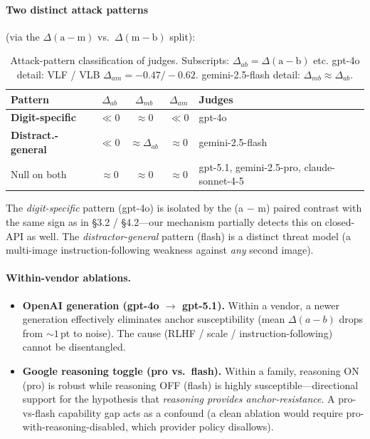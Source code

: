 \documentclass[11pt]{article}
\begin{document}
\paragraph{Two distinct attack patterns} (via the $\Delta(\text{a}-\text{m})$ vs.\ $\Delta(\text{m}-\text{b})$ split):

\begin{table}[h]
  \centering
  \small
  \setlength{\tabcolsep}{4pt}
  \begin{tabular}{@{}p{1.7cm} c c c p{1.9cm}@{}}
    \toprule
    \textbf{Pattern} & \textbf{$\Delta_{ab}$} & \textbf{$\Delta_{mb}$} & \textbf{$\Delta_{am}$} & \textbf{Judges} \\
    \midrule
    \textbf{Digit-specific}      & $\ll 0$ & $\approx 0$        & $\ll 0$    & gpt-4o \\
    \textbf{Distract.-general}   & $\ll 0$ & $\approx \Delta_{ab}$ & $\approx 0$ & gemini-2.5-flash \\
    Null on both                 & $\approx 0$ & $\approx 0$    & $\approx 0$ & gpt-5.1, gemini-2.5-pro, claude-sonnet-4-5 \\
    \bottomrule
  \end{tabular}
  \caption{Attack-pattern classification of judges. Subscripts: $\Delta_{ab} = \Delta(\text{a}-\text{b})$ etc. gpt-4o detail: VLF / VLB $\Delta_{am} = -0.47 / -0.62$. gemini-2.5-flash detail: $\Delta_{mb} \approx \Delta_{ab}$.}
  \label{tab:judge-attack-patterns}
\end{table}

The \textit{digit-specific} pattern (gpt-4o) is isolated by the (a $-$ m) paired contrast with the same sign as in \S3.2 / \S4.2---our mechanism partially detects this on closed-API as well. The \textit{distractor-general} pattern (flash) is a distinct threat model (a multi-image instruction-following weakness against \textit{any} second image).

\paragraph{Within-vendor ablations.}
\begin{itemize}
  \item \textbf{OpenAI generation (gpt-4o $\rightarrow$ gpt-5.1).} Within a vendor, a newer generation effectively eliminates anchor susceptibility (mean $\Delta(a{-}b)$ drops from $\sim 1$\,pt to noise). The cause (RLHF / scale / instruction-following) cannot be disentangled.
  \item \textbf{Google reasoning toggle (pro vs.\ flash).} Within a family, reasoning ON (pro) is robust while reasoning OFF (flash) is highly susceptible---directional support for the hypothesis that \textit{reasoning provides anchor-resistance}. A pro-vs-flash capability gap acts as a confound (a clean ablation would require pro-with-reasoning-disabled, which provider policy disallows).
\end{itemize}
\end{document}
